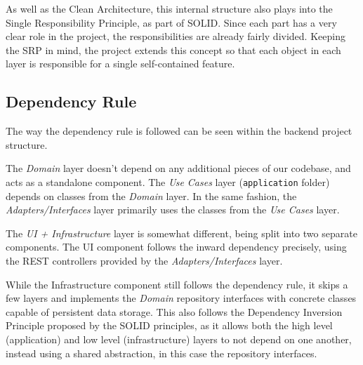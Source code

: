 As well as the Clean Architecture, this internal structure also plays into the Single Responsibility Principle, as part of SOLID.
Since each part has a very clear role in the project, the responsibilities are already fairly divided.
Keeping the SRP in mind, the project extends this concept so that each object in each layer is responsible for a single self-contained feature.

\subsection{Dependency Rule}

The way the dependency rule is followed can be seen within the backend project structure.

The \textit{Domain} layer doesn't depend on any additional pieces of our codebase, and acts as a standalone component.
The \textit{Use Cases} layer (\verb|application| folder) depends on classes from the \textit{Domain} layer.
In the same fashion, the \textit{Adapters/Interfaces} layer primarily uses the classes from the \textit{Use Cases} layer.

The \textit{UI + Infrastructure} layer is somewhat different, being split into two separate components.
The UI component follows the inward dependency precisely, using the REST controllers provided by the \textit{Adapters/Interfaces} layer.

While the Infrastructure component still follows the dependency rule, it skips a few layers
and implements the \textit{Domain} repository interfaces with concrete classes capable of persistent data storage.
This also follows the Dependency Inversion Principle proposed by the SOLID principles,
as it allows both the high level (application) and low level (infrastructure) layers to not depend on one another,
instead using a shared abstraction, in this case the repository interfaces.


